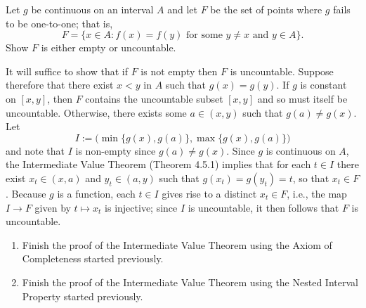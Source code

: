 \documentclass{lew98_solutions}
\begin{document}
\begin{exercise}
\label{ex:4.5.4}
    Let \( g \) be continuous on an interval \( A \) and let \( F \) be the set of points where \( g \) fails to be one-to-one; that is,
    \[
        F = \{ x \in A : f(x) = f(y) \text{ for some } y \neq x \text{ and } y \in A \}.
    \]
    Show \( F \) is either empty or uncountable.
\end{exercise}

\begin{solution}
    It will suffice to show that if \( F \) is not empty then \( F \) is uncountable. Suppose therefore that there exist \( x < y \) in \( A \) such that \( g(x) = g(y) \). If \( g \) is constant on \( [x, y] \), then \( F \) contains the uncountable subset \( [x, y] \) and so must itself be uncountable. Otherwise, there exists some \( a \in (x, y) \) such that \( g(a) \neq g(x) \). Let
    \[
        I := \big( \min \{ g(x), g(a) \}, \max \{ g(x), g(a) \} \big)
    \]
    and note that \( I \) is non-empty since \( g(a) \neq g(x) \). Since \( g \) is continuous on \( A \), the Intermediate Value Theorem (Theorem 4.5.1) implies that for each \( t \in I \) there exist \( x_t \in (x, a) \) and \( y_t \in (a, y) \) such that \( g(x_t) = g(y_t) = t \), so that \( x_t \in F \). Because \( g \) is a function, each \( t \in I \) gives rise to a distinct \( x_t \in F \), i.e., the map \( I \to F \) given by \( t \mapsto x_t \) is injective; since \( I \) is uncountable, it then follows that \( F \) is uncountable.
\end{solution}

\begin{exercise}
\label{ex:4.5.5}
    \begin{enumerate}
        \item Finish the proof of the Intermediate Value Theorem using the Axiom of Completeness started previously.

        \item Finish the proof of the Intermediate Value Theorem using the Nested Interval Property started previously.
    \end{enumerate}
\end{exercise}
\end{document}
